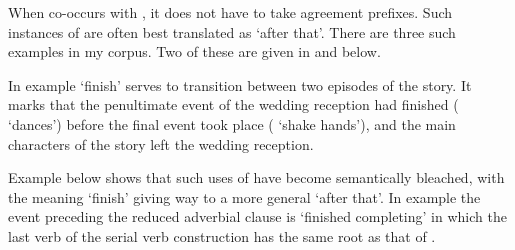When  co-occurs with ,
it does not have to take agreement prefixes.
Such instances of 
are often best translated as `after that'.
There are three such examples in my corpus.
Two of these are given in  and  below.

In example   `finish'
serves to transition between two episodes of the story.
It marks that the penultimate event of the wedding reception
had finished ( `dances')
before the final event took place ( `shake hands'),
and the main characters of the story left the wedding reception.

\begin{exe}
	\label{ex:130902-1, 3.23-3.28}
		\begin{xlist}
		\end{xlist}
\end{exe}

Example  below shows that such uses of 
have become semantically bleached, with the meaning `finish'
giving way to a more general `after that'.
In example  the event preceding
the reduced adverbial clause is  `finished completing'
in which the last verb of the serial verb construction
has the same root as that of .


